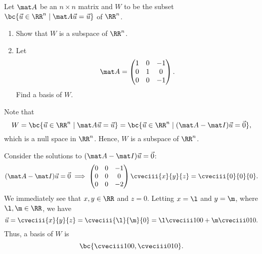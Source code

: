 \begin{problem}
    Let $\mat A$ be an $n \times n$ matrix and $W$ to be the subset $\bc{\vec u \in \RR^n \mid \mat A \vec u = \vec u}$ of $\RR^n$.

    \begin{enumerate}
        \item Show that $W$ is a subspace of $\RR^n$.
        \item Let \[\mat A = \begin{pmatrix}1 & 0 & -1 \\ 0 & 1 & 0 \\ 0 & 0 & -1\end{pmatrix}.\] Find a basis of $W$.
    \end{enumerate}
\end{problem}
\begin{solution}
    \begin{ppart}
        Note that \[W = \bc{\vec u \in \RR^n \mid \mat A \vec u = \vec u} = \bc{\vec u \in \RR^n \mid (\mat A - \mat I) \vec u = \vec 0},\] which is a null space in $\RR^n$. Hence, $W$ is a subspace of $\RR^n$.
    \end{ppart}
    \begin{ppart}
        Consider the solutions to $(\mat A - \mat I) \vec u = \vec 0$: \[(\mat A - \mat I) \vec u = \vec 0 \implies \begin{pmatrix}0 & 0 & -1 \\ 0 & 0 & 0 \\ 0 & 0 & -2 \end{pmatrix} \cveciii{x}{y}{z} = \cveciii{0}{0}{0}.\] We immediately see that $x, y \in \RR$ and $z = 0$. Letting $x = \l$ and $y = \m$, where $\l, \m \in \RR$, we have \[\vec u = \cveciii{x}{y}{z} = \cveciii{\l}{\m}{0} = \l \cveciii100 + \m \cveciii010.\] Thus, a basis of $W$ is \[\bc{\cveciii100, \cveciii010}.\]
    \end{ppart}
\end{solution}


